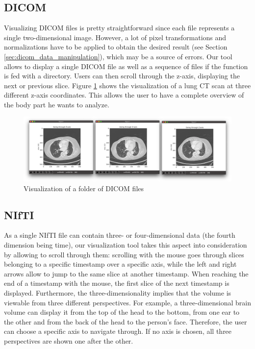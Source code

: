 \subsection{DICOM}
\setlength{\marginparwidth}{3cm}\leavevmode {}Visualizing DICOM files is pretty straightforward since each file represents a single two-dimensional image. However, a lot of pixel transformations and normalizations have to be applied to obtain the desired result (see Section \ref{sec:dicom_data_manipulation}), which may be a source of errors. Our tool allows to display a single DICOM file as well as a sequence of files if the function is fed with a directory. Users can then scroll through the z-axis, displaying the next or previous slice.  Figure \ref{fig:visualize_lung_dcm} shows the visualization of a lung CT scan at three different z-axis coordinates. This allows the user to have a complete overview of the body part he wants to analyze.

\begin{figure}[!h]
\centering
\includegraphics[width=\textwidth, keepaspectratio=true]{./figures/visualize_lung_dcm.png}
\caption{Visualization of a folder of DICOM files}
\label{fig:visualize_lung_dcm}
\end{figure}


\subsection{NIfTI}
\setlength{\marginparwidth}{3cm}\leavevmode {}As a single NIfTI file can contain three- or four-dimensional data (the fourth dimension being time), our visualization tool takes this aspect into consideration by allowing to scroll through them: scrolling with the mouse goes through slices belonging to a specific timestamp over a specific axis, while the left and right arrows allow to jump to the same slice at another timestamp. When reaching the end of a timestamp with the mouse, the first slice of the next timestamp is displayed. Furthermore, the three-dimensionality implies that the volume is viewable from three different perspectives. For example, a three-dimensional brain volume can display it from the top of the head to the bottom, from one ear to the other and from the back of the head to the person's face. Therefore, the user can choose a specific axis to navigate through. If no axis is chosen, all three perspectives are shown one after the other.

